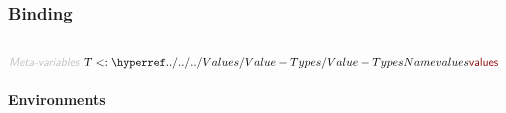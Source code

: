 \subsubsection*{Binding}\hypertarget{binding}{}\label{binding}

\begin{align*}
  [ ~ 
  \KEY{Type} ~ & \NAMEREF{environments} \\
  \KEY{Alias} ~ & \NAMEREF{envs} \\
  \KEY{Datatype} ~ & \NAMEREF{identifiers} \\
  \KEY{Alias} ~ & \NAMEREF{ids} \\
  \KEY{Funcon} ~ & \NAMEREF{identifier-tagged} \\
  \KEY{Alias} ~ & \NAMEREF{id-tagged} \\
  \KEY{Funcon} ~ & \NAMEREF{fresh-identifier} \\
  \KEY{Entity} ~ & \NAMEREF{environment} \\
  \KEY{Alias} ~ & \NAMEREF{env} \\
  \KEY{Funcon} ~ & \NAMEREF{initialise-binding} \\
  \KEY{Funcon} ~ & \NAMEREF{bind-value} \\
  \KEY{Alias} ~ & \NAMEREF{bind} \\
  \KEY{Funcon} ~ & \NAMEREF{unbind} \\
  \KEY{Funcon} ~ & \NAMEREF{bound-directly} \\
  \KEY{Funcon} ~ & \NAMEREF{bound-value} \\
  \KEY{Alias} ~ & \NAMEREF{bound} \\
  \KEY{Funcon} ~ & \NAMEREF{closed} \\
  \KEY{Funcon} ~ & \NAMEREF{scope} \\
  \KEY{Funcon} ~ & \NAMEREF{accumulate} \\
  \KEY{Funcon} ~ & \NAMEREF{collateral} \\
  \KEY{Funcon} ~ & \NAMEREF{bind-recursively} \\
  \KEY{Funcon} ~ & \NAMEREF{recursive}
  ~ ]
\end{align*}
\begin{align*}
  \KEY{Meta-variables} ~ 
  & \VAR{T} <: \NAMEHYPER{../../../Values}{Value-Types}{values}
\end{align*}
\paragraph*{Environments}\hypertarget{environments}{}\label{environments}

